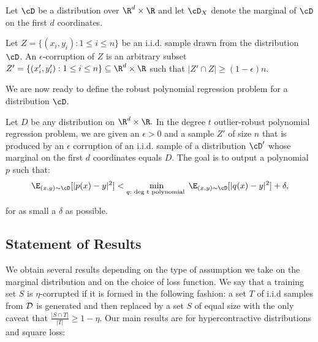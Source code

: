 \begin{definition}

\end{definition}

Let $\cD$ be a distribution over $\R^d \times \R$ and let $\cD_X$ denote the marginal of $\cD$ on the first $d$ coordinates. 

\begin{definition}
Let $Z = \{(x_i, y_i): 1 \leq i \leq n\}$ be an i.i.d. sample drawn from the distribution $\cD$. An $\epsilon$-corruption of $Z$ is an arbitrary subset $Z' = \{ (x_i',y_i') : 1 \leq i \leq n\} \subseteq \R^d\times \R$ such that $|Z' \cap Z| \geq (1-\epsilon)n.$
\end{definition}

We are now ready to define the robust polynomial regression problem for a distribution $\cD$. 
\begin{problem}
Let $D$ be any distribution on $\R^d \times \R.$ In the degree $t$ outlier-robust polynomial regression problem, we are given an $\epsilon > 0$ and a sample $Z'$ of size $n$ that is produced by an $\epsilon$ corruption of an i.i.d. sample of a distribution $\cD'$ whose marginal on the first $d$ coordinates equals $D.$ The goal is to output a polynomial $p$ such that:
\[
\E_{(x,y) \sim \cD}[ |p(x)-y|^2] < \min_{q: \text{ deg t polynomial } } \E_{(x,y) \sim \cD} [ |q(x)-y|^2] + \delta,
\]
for as small a $\delta$ as possible.
\end{problem}



\subsection{Statement of Results}
We obtain several results depending on the type of assumption we take
on the marginal distribution and on the choice of loss function.  We
say that a training set $S$ is $\eta$-corrupted if it is formed in the
following fashion: a set $T$ of i.i.d samples from ${\cal D}$ is generated and then replaced by a set $S$ of equal size with the only caveat that
$\frac{|S \cap T|}{|T|} \geq 1 - \eta$.  Our main results are for
hypercontractive distributions and square loss:

